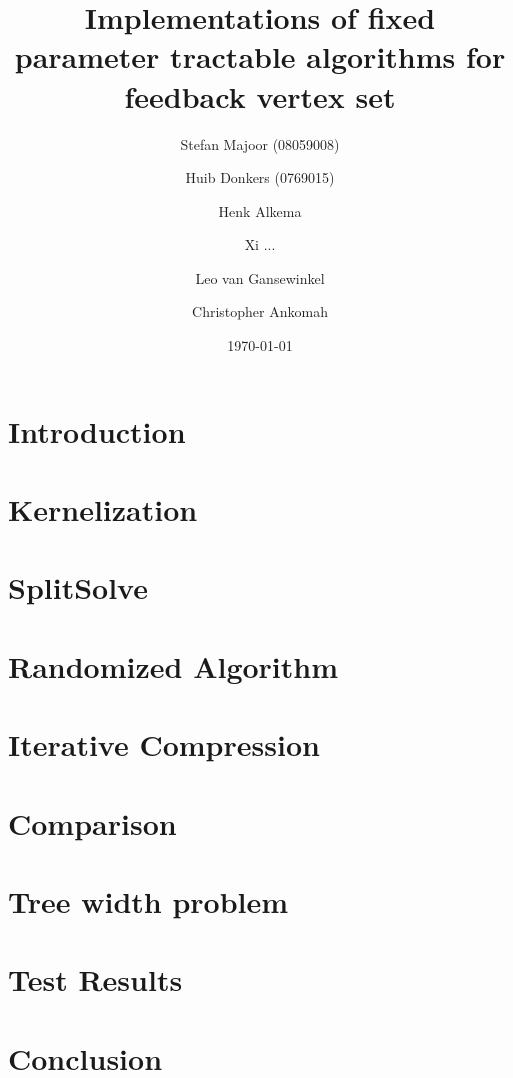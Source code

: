 \documentclass[a4paper,10pt]{article}
\title{Implementations of fixed parameter tractable algorithms for feedback vertex set}
\author{
	Stefan Majoor (08059008)
	\and
	Huib Donkers (0769015)
	\and
	Henk Alkema
	\and
	Xi ...
	\and
	Leo van Gansewinkel
	\and
	Christopher Ankomah
}
\date{\today}
\begin{document}
\maketitle
\tableofcontents
\clearpage

\begin{abstract}

\end{abstract}

\section{Introduction}


\section{Kernelization}


\section{SplitSolve}


\section{Randomized Algorithm}


\section{Iterative Compression}


\section{Comparison}


\section{Tree width problem}

\section{Test Results}

\section{Conclusion}
\end{document}
